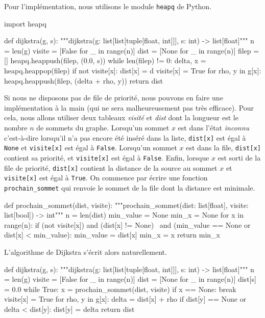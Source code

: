 \documentclass{magnolia}
\begin{document}
Pour l'implémentation, nous utilisons le module \verb!heapq! de Python.

\begin{pythoncodeline}
import heapq

def dijkstra(g, s):
    """dijkstra(g: list[list[tuple[float, int]]], s: int) -> list[float]"""
    n = len(g)
    visite = [False for _ in range(n)]
    dist = [None for _ in range(n)]
    filep = []
    heapq.heappush(filep, (0.0, s))
    while len(filep) != 0:
        delta, x = heapq.heappop(filep)
        if not visite[x]:
            dist[x] = d
            visite[x] = True
            for rho, y in g[x]:
                heapq.heappush(filep, (delta + rho, y))
    return dist
\end{pythoncodeline}

\vspace{2ex}
Si nous ne disposons pas de file de priorité, nous pouvons en faire une implémentation
à la main (qui ne sera malheureusement pas très efficace). Pour cela, nous allons utiliser
deux tableaux \emph{visité} et \emph{dist} dont la longueur est le nombre $n$ de sommets du graphe. Lorsqu'un sommet $x$ est dans l'état \emph{inconnu} c'est-à-dire lorsqu'il
n'a pas encore été inséré dans la liste, \verb!dist[x]! est égal à \verb!None! et
\verb!visite[x]! est égal à \verb!False!. Lorsqu'un sommet $x$ est dans la file,
\verb!dist[x]! contient sa priorité, et \verb!visite[x]! est égal à \verb!False!.
Enfin, lorsque $x$ est sorti de la file de priorité, \verb!dist[x]! contient la distance
de la source au sommet $x$ et \verb!visite[x]! est égal à \verb!True!.
On commence par écrire une fonction \verb!prochain_sommet! qui renvoie le sommet de
la file dont la distance est minimale.

\begin{pythoncodeline}
def prochain_sommet(dist, visite):
    """prochain_sommet(dist: list[float], visite: list[bool]) -> int"""
    n = len(dist)
    min_value = None
    min_x = None
    for x in range(n):
        if (not visite[x]) and (dist[x] != None) \
                and (min_value == None or dist[x] < min_value):
            min_value = dist[x]
            min_x = x
    return min_x
\end{pythoncodeline}
\noindent
L'algorithme de Dijkstra s'écrit alors naturellement.

\begin{pythoncodeline}
def dijkstra(g, s):
    """dijkstra(g: list[list[tuple[float, int]]], s: int) -> list[float]"""
    n = len(g)
    visite = [False for _ in range(n)]
    dist = [None for _ in range(n)]
    dist[s] = 0.0
    while True:
        x = prochain_sommet(dist, visite)
        if x == None:
            break
        visite[x] = True
        for rho, y in g[x]:
            delta = dist[x] + rho
            if dist[y] == None or delta < dist[y]:
                dist[y] = delta
    return dist
\end{pythoncodeline}
\end{document}
